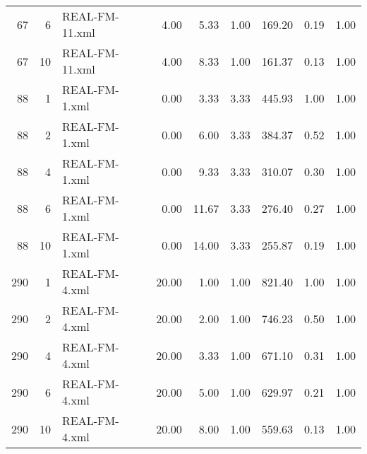 \begin{table}[ht]
\begin{tabular}{rrlrrrrrr}
   67 &   6 & REAL-FM-11.xml & 4.00 & 5.33 & 1.00 & 169.20 & 0.19 & 1.00 \\ 
   67 &  10 & REAL-FM-11.xml & 4.00 & 8.33 & 1.00 & 161.37 & 0.13 & 1.00 \\ 
   88 &   1 & REAL-FM-1.xml & 0.00 & 3.33 & 3.33 & 445.93 & 1.00 & 1.00 \\ 
   88 &   2 & REAL-FM-1.xml & 0.00 & 6.00 & 3.33 & 384.37 & 0.52 & 1.00 \\ 
   88 &   4 & REAL-FM-1.xml & 0.00 & 9.33 & 3.33 & 310.07 & 0.30 & 1.00 \\ 
   88 &   6 & REAL-FM-1.xml & 0.00 & 11.67 & 3.33 & 276.40 & 0.27 & 1.00 \\ 
   88 &  10 & REAL-FM-1.xml & 0.00 & 14.00 & 3.33 & 255.87 & 0.19 & 1.00 \\ 
  290 &   1 & REAL-FM-4.xml & 20.00 & 1.00 & 1.00 & 821.40 & 1.00 & 1.00 \\ 
  290 &   2 & REAL-FM-4.xml & 20.00 & 2.00 & 1.00 & 746.23 & 0.50 & 1.00 \\ 
  290 &   4 & REAL-FM-4.xml & 20.00 & 3.33 & 1.00 & 671.10 & 0.31 & 1.00 \\ 
  290 &   6 & REAL-FM-4.xml & 20.00 & 5.00 & 1.00 & 629.97 & 0.21 & 1.00 \\ 
  290 &  10 & REAL-FM-4.xml & 20.00 & 8.00 & 1.00 & 559.63 & 0.13 & 1.00 \\ 
   \hline
\end{tabular}
\end{table}
